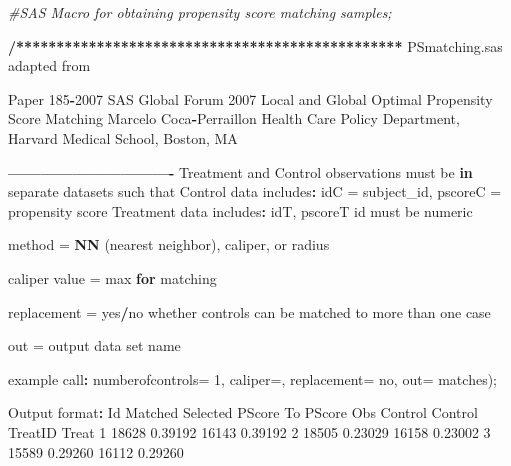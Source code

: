 \documentclass[]{article}
\newenvironment{Shaded}{\begin{snugshade}}{\end{snugshade}}
\newcommand{\KeywordTok}[1]{\textcolor[rgb]{0.13,0.29,0.53}{\textbf{#1}}}
\newcommand{\DataTypeTok}[1]{\textcolor[rgb]{0.13,0.29,0.53}{#1}}
\newcommand{\DecValTok}[1]{\textcolor[rgb]{0.00,0.00,0.81}{#1}}
\newcommand{\FloatTok}[1]{\textcolor[rgb]{0.00,0.00,0.81}{#1}}
\newcommand{\StringTok}[1]{\textcolor[rgb]{0.31,0.60,0.02}{#1}}
\newcommand{\CommentTok}[1]{\textcolor[rgb]{0.56,0.35,0.01}{\textit{#1}}}
\newcommand{\ControlFlowTok}[1]{\textcolor[rgb]{0.13,0.29,0.53}{\textbf{#1}}}
\newcommand{\OperatorTok}[1]{\textcolor[rgb]{0.81,0.36,0.00}{\textbf{#1}}}
\newcommand{\ErrorTok}[1]{\textcolor[rgb]{0.64,0.00,0.00}{\textbf{#1}}}
\newcommand{\NormalTok}[1]{#1}
\begin{document}
\begin{Shaded}
\begin{Highlighting}[]
\CommentTok{#SAS Macro for obtaining propensity score matching samples;}


\OperatorTok{/}\ErrorTok{************************************************}\StringTok{ }
\StringTok{    }\NormalTok{PSmatching.sas   adapted from}
    
\NormalTok{    Paper }\DecValTok{185}\OperatorTok{-}\DecValTok{2007}\NormalTok{  SAS Global Forum }\DecValTok{2007}
\NormalTok{    Local and Global Optimal Propensity Score Matching}
\NormalTok{    Marcelo Coca}\OperatorTok{-}\NormalTok{Perraillon}
\NormalTok{    Health Care Policy Department, Harvard Medical School, Boston, MA}
    
    \OperatorTok{-------------------------------}
\StringTok{ }\NormalTok{Treatment and Control observations must be }\ControlFlowTok{in}\NormalTok{ separate datasets such that }
\NormalTok{    Control data includes}\OperatorTok{:}\StringTok{ }\NormalTok{idC =}\StringTok{  }\NormalTok{subject_id, pscoreC =}\StringTok{ }\NormalTok{propensity score}
\NormalTok{    Treatment data includes}\OperatorTok{:}\StringTok{ }\NormalTok{idT, pscoreT}
\NormalTok{    id must be numeric  }
    
\NormalTok{    method =}\StringTok{ }\KeywordTok{NN}\NormalTok{ (nearest neighbor), caliper, or radius }
    
\NormalTok{    caliper value =}\StringTok{ }\NormalTok{max }\ControlFlowTok{for}\NormalTok{ matching}
    
\NormalTok{    replacement =}\StringTok{ }\NormalTok{yes}\OperatorTok{/}\NormalTok{no  whether controls can be matched to more than one case}
    
\NormalTok{    out =}\StringTok{ }\NormalTok{output data set name}
    
\NormalTok{    example call}\OperatorTok{:}
\StringTok{    }
\StringTok{     }\NormalTok{%}\KeywordTok{PSMatching}\NormalTok{(}\DataTypeTok{datatreatment=}\NormalTok{ T, }\DataTypeTok{datacontrol=}\NormalTok{ C, }\DataTypeTok{method=}\NormalTok{ NN,}
      \DataTypeTok{numberofcontrols=} \DecValTok{1}\NormalTok{, }\DataTypeTok{caliper=}\NormalTok{, }\DataTypeTok{replacement=}\NormalTok{ no, }\DataTypeTok{out=}\NormalTok{ matches);}
      
\NormalTok{ Output format}\OperatorTok{:}
\StringTok{           }\NormalTok{Id                  Matched}
\NormalTok{       Selected     PScore       To       PScore}
\NormalTok{Obs     Control    Control    TreatID     Treat}
  \DecValTok{1}      \DecValTok{18628}     \FloatTok{0.39192}     \DecValTok{16143}     \FloatTok{0.39192}
  \DecValTok{2}      \DecValTok{18505}     \FloatTok{0.23029}     \DecValTok{16158}     \FloatTok{0.23002}
  \DecValTok{3}      \DecValTok{15589}     \FloatTok{0.29260}     \DecValTok{16112}     \FloatTok{0.29260}

}
\end{Highlighting}
\end{Shaded}
\end{document}
